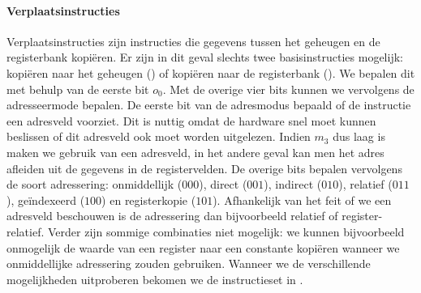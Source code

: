 \paragraph{Verplaatsinstructies}
Verplaatsinstructies zijn instructies die gegevens tussen het geheugen en de registerbank kopi\"eren. Er zijn in dit geval slechts twee basisinstructies mogelijk: kopi\"eren naar het geheugen () of kopi\"eren naar de registerbank (). We bepalen dit met behulp van de eerste bit $o_0$. Met de overige vier bits kunnen we vervolgens de adresseermode bepalen. De eerste bit van de adresmodus bepaald of de instructie een adresveld voorziet. Dit is nuttig omdat de hardware snel moet kunnen beslissen of dit adresveld ook moet worden uitgelezen. Indien $m_3$ dus laag is maken we gebruik van een adresveld, in het andere geval kan men het adres afleiden uit de gegevens in de registervelden. De overige bits bepalen vervolgens de soort adressering: onmiddellijk ($000$), direct ($001$), indirect ($010$), relatief ($011$), ge\"indexeerd ($100$) en registerkopie ($101$). Afhankelijk van het feit of we een adresveld beschouwen is de adressering dan bijvoorbeeld relatief of register-relatief. Verder zijn sommige combinaties niet mogelijk: we kunnen bijvoorbeeld onmogelijk de waarde van een register naar een constante kopi\"eren wanneer we onmiddellijke adressering zouden gebruiken. Wanneer we de verschillende mogelijkheden uitproberen bekomen we de instructieset in .
